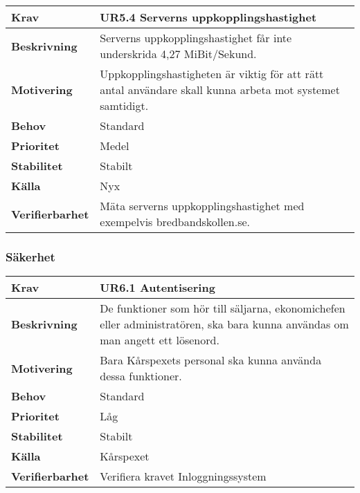 \documentclass[a4paper, twoside, 11pt, titlepage]{article}
\begin{document}
		\begin {table} [ht] \begin{tabular} { p{2.6cm} p{12.5cm} }
			\hline
			{\sffamily\textbf{Krav}} & {\sffamily\textbf{UR5.4 Serverns uppkopplingshastighet}} \\
			\hline
			{\sffamily\textbf{Beskrivning}} & {Serverns uppkopplingshastighet får inte underskrida 4,27 MiBit/Sekund.} \\
			\hline
			{\sffamily\textbf{Motivering}} & {Uppkopplingshastigheten är viktig för att rätt antal användare skall kunna arbeta mot systemet samtidigt.} \\
			\hline
			{\sffamily\textbf{Behov}} & {Standard} \\
			\hline
			{\sffamily\textbf{Prioritet}} & {Medel} \\
			\hline
			{\sffamily\textbf{Stabilitet}} & {Stabilt} \\
			\hline
			{\sffamily\textbf{Källa}} & {Nyx} \\
			\hline
			{\sffamily\textbf{Verifierbarhet}} & {Mäta serverns uppkopplingshastighet med exempelvis bredbandskollen.se.} \\
			\hline
		\end{tabular} \end{table} \FloatBarrier


		\subsubsection{Säkerhet}


		\begin {table} [ht] \begin{tabular} { p{2.6cm} p{12.5cm} }
			\hline
			{\sffamily\textbf{Krav}} & {\sffamily\textbf{UR6.1 Autentisering}} \\
			\hline
			{\sffamily\textbf{Beskrivning}} & {De funktioner som hör till säljarna, ekonomichefen eller administratören, ska bara kunna användas om man angett ett lösenord.} \\
			\hline
			{\sffamily\textbf{Motivering}} & {Bara Kårspexets personal ska kunna använda dessa funktioner.} \\
			\hline
			{\sffamily\textbf{Behov}} & {Standard} \\
			\hline
			{\sffamily\textbf{Prioritet}} & {Låg} \\
			\hline
			{\sffamily\textbf{Stabilitet}} & {Stabilt} \\
			\hline
			{\sffamily\textbf{Källa}} & {Kårspexet} \\
			\hline
			{\sffamily\textbf{Verifierbarhet}} & {Verifiera kravet Inloggningssystem} \\
			\hline
		\end{tabular} \end{table} \FloatBarrier
		\vspace{6mm}
\end{document}

